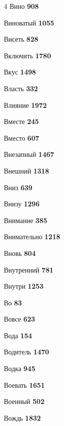 \begin{multicols}{4}
\noindent Вино \dotfill \textbf{\color{secondary} 908}\par
\noindent Виноватый \dotfill \textbf{\color{secondary} 1055}\par
\noindent Висеть \dotfill \textbf{\color{secondary} 828}\par
\noindent Включить \dotfill \textbf{\color{secondary} 1780}\par
\noindent Вкус \dotfill \textbf{\color{secondary} 1498}\par
\noindent Власть \dotfill \textbf{\color{secondary} 332}\par
\noindent Влияние \dotfill \textbf{\color{secondary} 1972}\par
\noindent Вместе \dotfill \textbf{\color{secondary} 245}\par
\noindent Вместо \dotfill \textbf{\color{secondary} 607}\par
\noindent Внезапный \dotfill \textbf{\color{secondary} 1467}\par
\noindent Внешний \dotfill \textbf{\color{secondary} 1318}\par
\noindent Вниз \dotfill \textbf{\color{secondary} 639}\par
\noindent Внизу \dotfill \textbf{\color{secondary} 1296}\par
\noindent Внимание \dotfill \textbf{\color{secondary} 385}\par
\noindent Внимательно \dotfill \textbf{\color{secondary} 1218}\par
\noindent Вновь \dotfill \textbf{\color{secondary} 804}\par
\noindent Внутренний \dotfill \textbf{\color{secondary} 781}\par
\noindent Внутри \dotfill \textbf{\color{secondary} 1253}\par
\noindent Во \dotfill \textbf{\color{secondary} 83}\par
\noindent Вовсе \dotfill \textbf{\color{secondary} 623}\par
\noindent Вода \dotfill \textbf{\color{secondary} 154}\par
\noindent Водитель \dotfill \textbf{\color{secondary} 1470}\par
\noindent Водка \dotfill \textbf{\color{secondary} 945}\par
\noindent Воевать \dotfill \textbf{\color{secondary} 1651}\par
\noindent Военный \dotfill \textbf{\color{secondary} 502}\par
\noindent Вождь \dotfill \textbf{\color{secondary} 1832}\par

\end{multicols}
